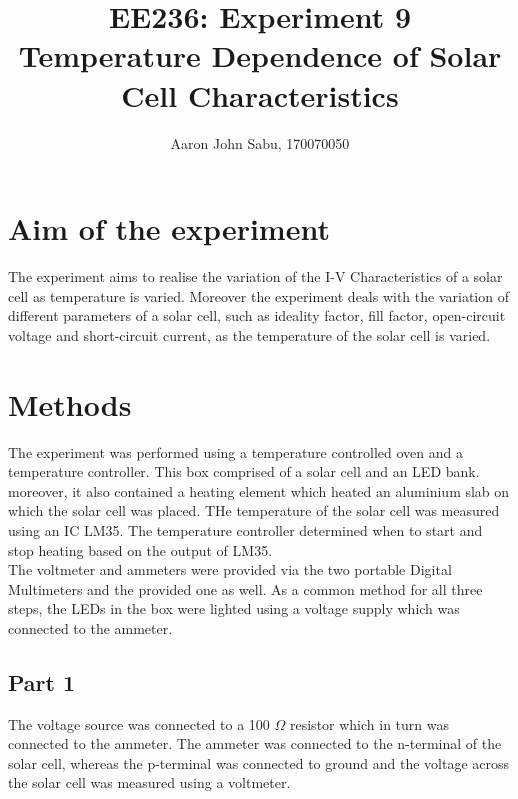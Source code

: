 \documentclass[12pt]{article}
\title{EE236: Experiment 9\\
Temperature Dependence of Solar Cell Characteristics}
\author{Aaron John Sabu, 170070050}
\begin{document}
\maketitle

\section{Aim of the experiment}

The experiment aims to realise the variation of the I-V Characteristics of a solar cell as temperature is varied. Moreover the experiment deals with the variation of different parameters of a solar cell, such as ideality factor, fill factor, open-circuit voltage and short-circuit current, as the temperature of the solar cell is varied.

\section{Methods}

The experiment was performed using a temperature controlled oven and a temperature controller. This box comprised of a solar cell and an LED bank. moreover, it also contained a heating element which heated an aluminium slab on which the solar cell was placed. THe temperature of the solar cell was measured using an IC LM35. The temperature controller determined when to start and stop heating based on the output of LM35.\\
The voltmeter and ammeters were provided via the two portable Digital Multimeters and the provided one as well. As a common method for all three steps, the LEDs in the box were lighted using a voltage supply which was connected to the ammeter.

\subsection{Part 1}

The voltage source was connected to a 100 \(\Omega\) resistor which in turn was connected to the ammeter. The ammeter was connected to the n-terminal of the solar cell, whereas the p-terminal was connected to ground and the voltage across the solar cell was measured using a voltmeter.
\end{document}
